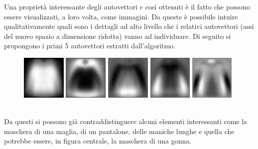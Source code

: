\documentclass[]{report}
\begin{document}
	Una proprietà interessante degli autovettori $e$ così ottenuti è il fatto che possono essere visualizzati, a loro volta, come immagini. Da queste è possibile intuire qualitativamente quali sono i dettagli ad alto livello che i relativi autovettori (assi del nuovo spazio a dimensione ridotta) vanno ad individuare. Di seguito si propongono i primi 5 autovettori estratti dall'algoritmo. \\
	\begin{figure}[ht!]
		\includegraphics[width=.195\textwidth,height=80px]{./img/pca1}\hfill
		\includegraphics[width=.195\textwidth,height=80px]{./img/pca2}\hfill
		\includegraphics[width=.195\textwidth,height=80px]{./img/pca3}\hfill
		\includegraphics[width=.195\textwidth,height=80px]{./img/pca4}\hfill
		\includegraphics[width=.195\textwidth,height=80px]{./img/pca5}
	\end{figure} 
	\\
	Da questi si possono già contraddistinguere alcuni elementi interessanti come la maschera di una maglia, di un pantalone, delle maniche lunghe e quella che potrebbe essere, in figura centrale, la maschera di una gonna. 
 
\end{document}
